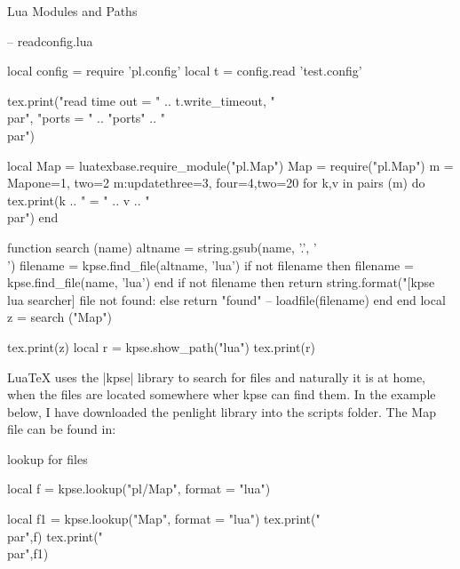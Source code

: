 
\begin{texexample}{Lua Modules and Paths}{}

\begin{luacode}
  -- readconfig.lua
  
local config       = require 'pl.config'
local t               = config.read 'test.config'

tex.print("read time out = " .. t.write_timeout, "\\par",
            "ports = " .. "ports" .. "\\par")

 local Map = luatexbase.require_module("pl.Map")   
 Map = require("pl.Map")
   m = Map{one=1, two=2}
   m:update{three=3, four=4,two=20}
   for k,v in pairs (m) do
       tex.print(k .. " = " .. v .. "\\par")
   end 
   
 function search (name)
    altname = string.gsub(name, '.', '\\')
    filename = kpse.find_file(altname, 'lua')	
    if not filename then
      filename = kpse.find_file(name, 'lua')
    end
    if not filename then
      return string.format("[kpse lua searcher] file not found: %
    else
      return "found" -- loadfile(filename)
    end
end
local z = search ("Map")

tex.print(z)
local r = kpse.show_path("lua")
tex.print(r)
\end{luacode}
\end{texexample}



LuaTeX uses the |kpse| library to search for files and naturally it is at home, when the files are located somewhere wher kpse can find them. In the example below, I have downloaded the penlight library into the scripts folder. The Map file can be found in:

\begin{texexample}{lookup for files}{}
\begin{luacode}
local f = kpse.lookup("pl/Map", {format = "lua"})

local f1 = kpse.lookup("Map", {format = "lua"})
tex.print("\\par",f)
tex.print("\\par",f1)
\end{luacode}
\end{texexample}

